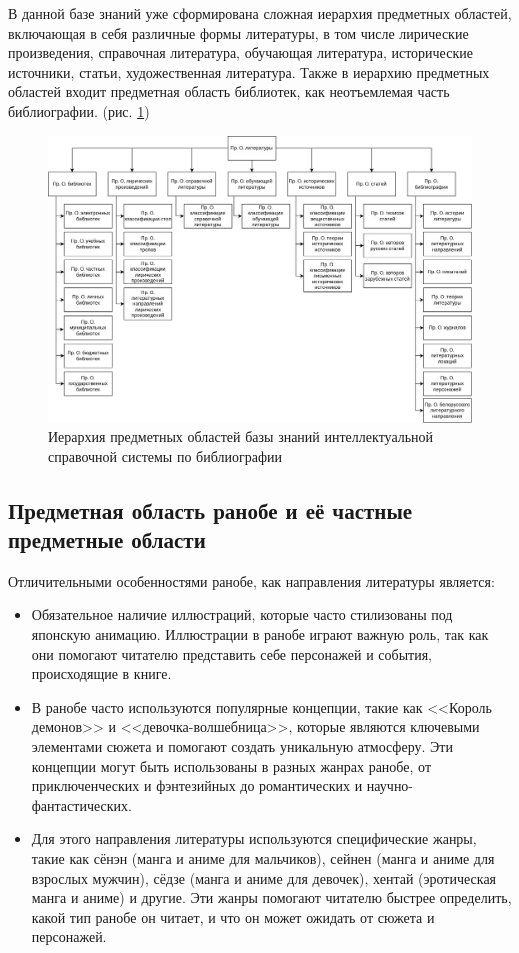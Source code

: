 В данной базе знаний уже сформирована сложная иерархия предметных областей, включающая в себя различные формы литературы, в том числе лирические произведения, справочная литература, обучающая литература, исторические источники, статьи, художественная литература. Также в иерархию предметных областей входит предметная область библиотек, как неотъемлемая часть библиографии. (рис. \ref{fig:bib-structure})
\begin{figure}[H]
    \centering
    \includegraphics[scale=0.14]{imgs/existing_diag.drawio.png}
    \caption{Иерархия предметных областей базы знаний интеллектуальной справочной системы по библиографии}
    \label{fig:bib-structure}
\end{figure}

\subsection{Предметная область ранобе и её частные предметные области}

Отличительными особенностями ранобе, как направления литературы является:
\begin{itemize}
    \item Обязательное наличие иллюстраций, которые часто стилизованы под японскую анимацию. Иллюстрации в ранобе играют важную роль, так как они помогают читателю представить себе персонажей и события, происходящие в книге.

    \item В ранобе часто используются популярные концепции, такие как <<Король демонов>> и <<девочка-волшебница>>, которые являются ключевыми элементами сюжета и помогают создать уникальную атмосферу. Эти концепции могут быть использованы в разных жанрах ранобе, от приключенческих и фэнтезийных до романтических и научно-фантастических.

    \item Для этого направления литературы используются специфические жанры, такие как сёнэн (манга и аниме для мальчиков), сейнен (манга и аниме для взрослых мужчин), сёдзе (манга и аниме для девочек), хентай (эротическая манга и аниме) и другие. Эти жанры помогают читателю быстрее определить, какой тип ранобе он читает, и что он может ожидать от сюжета и персонажей.
\end{itemize}

